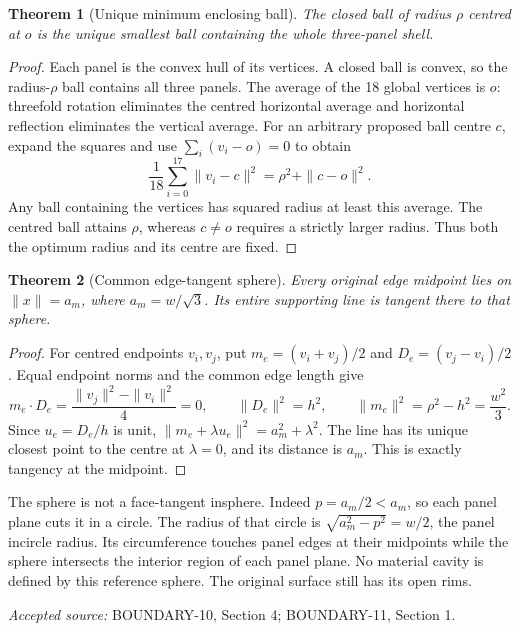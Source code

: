 \documentclass[11pt,a4paper]{article}
\newtheorem{theorem}{Theorem}[section]
\newcommand{\source}[1]{\par{\small\emph{Accepted source:} #1}\par}
\begin{document}
\begin{theorem}[Unique minimum enclosing ball]\label{thm:minball}
The closed ball of radius $\rho$ centred at $o$ is the unique smallest ball containing the whole three-panel shell.
\end{theorem}
\begin{proof}
Each panel is the convex hull of its vertices. A closed ball is convex, so the radius-$\rho$ ball contains all three panels. The average of the 18 global vertices is $o$: threefold rotation eliminates the centred horizontal average and horizontal reflection eliminates the vertical average. For an arbitrary proposed ball centre $c$, expand the squares and use $\sum_i(v_i-o)=0$ to obtain
\begin{equation}\label{eq:minball}
\frac1{18}\sum_{i=0}^{17}\|v_i-c\|^2
=\rho^2+\|c-o\|^2.
\end{equation}
Any ball containing the vertices has squared radius at least this average. The centred ball attains $\rho$, whereas $c\ne o$ requires a strictly larger radius. Thus both the optimum radius and its centre are fixed.
\end{proof}

\begin{theorem}[Common edge-tangent sphere]\label{thm:midsphere}
Every original edge midpoint lies on $\|x\|=a_m$, where $a_m=w/\sqrt3$. Its entire supporting line is tangent there to that sphere.
\end{theorem}
\begin{proof}
For centred endpoints $v_i,v_j$, put $m_e=(v_i+v_j)/2$ and $D_e=(v_j-v_i)/2$. Equal endpoint norms and the common edge length give
\begin{equation}\label{eq:midpoint}
m_e\cdot D_e=\frac{\|v_j\|^2-\|v_i\|^2}{4}=0,
\qquad \|D_e\|^2=h^2,
\qquad \|m_e\|^2=\rho^2-h^2=\frac{w^2}{3}.
\end{equation}
Since $u_e=D_e/h$ is unit, $\|m_e+\lambda u_e\|^2=a_m^2+\lambda^2$. The line has its unique closest point to the centre at $\lambda=0$, and its distance is $a_m$. This is exactly tangency at the midpoint.
\end{proof}
The sphere is not a face-tangent insphere. Indeed $p=a_m/2<a_m$, so each panel plane cuts it in a circle. The radius of that circle is $\sqrt{a_m^2-p^2}=w/2$, the panel incircle radius. Its circumference touches panel edges at their midpoints while the sphere intersects the interior region of each panel plane. No material cavity is defined by this reference sphere. The original surface still has its open rims.
\source{BOUNDARY-10, Section 4; BOUNDARY-11, Section 1.}
\end{document}
